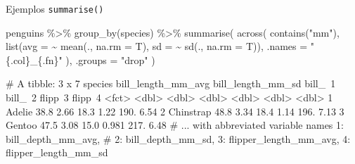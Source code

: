 \documentclass[
  ignorenonframetext,
  aspectratio=169]{beamer}
\newenvironment{Shaded}{\begin{snugshade}}{\end{snugshade}}
\newcommand{\AttributeTok}[1]{\textcolor[rgb]{0.77,0.63,0.00}{#1}}
\newcommand{\FunctionTok}[1]{\textcolor[rgb]{0.00,0.00,0.00}{#1}}
\newcommand{\NormalTok}[1]{#1}
\newcommand{\SpecialCharTok}[1]{\textcolor[rgb]{0.00,0.00,0.00}{#1}}
\newcommand{\StringTok}[1]{\textcolor[rgb]{0.31,0.60,0.02}{#1}}
\let\oldverbatim\verbatim
\let\endoldverbatim\endverbatim
\renewenvironment{verbatim}{\tiny\oldverbatim}{\endoldverbatim}
\begin{document}
\begin{frame}[fragile]{Ejemplos \texttt{summarise()}}
\protect\hypertarget{ejemplos-summarise-3}{}
\begin{Shaded}
\begin{Highlighting}[]
\NormalTok{penguins }\SpecialCharTok{\%\textgreater{}\%}
  \FunctionTok{group\_by}\NormalTok{(species) }\SpecialCharTok{\%\textgreater{}\%}
  \FunctionTok{summarise}\NormalTok{(}
    \FunctionTok{across}\NormalTok{(}
      \FunctionTok{contains}\NormalTok{(}\StringTok{"mm"}\NormalTok{),}
      \FunctionTok{list}\NormalTok{(}\AttributeTok{avg =} \SpecialCharTok{\textasciitilde{}} \FunctionTok{mean}\NormalTok{(., }\AttributeTok{na.rm =}\NormalTok{ T), }\AttributeTok{sd =} \SpecialCharTok{\textasciitilde{}} \FunctionTok{sd}\NormalTok{(., }\AttributeTok{na.rm =}\NormalTok{ T)),}
      \AttributeTok{.names =} \StringTok{"\{.col\}\_\{.fn\}"}
\NormalTok{    ),}
    \AttributeTok{.groups =} \StringTok{"drop"}
\NormalTok{  )}
\end{Highlighting}
\end{Shaded}

\begin{verbatim}
# A tibble: 3 x 7
  species   bill_length_mm_avg bill_length_mm_sd bill_~1 bill_~2 flipp~3 flipp~4
  <fct>                  <dbl>             <dbl>   <dbl>   <dbl>   <dbl>   <dbl>
1 Adelie                  38.8              2.66    18.3   1.22     190.    6.54
2 Chinstrap               48.8              3.34    18.4   1.14     196.    7.13
3 Gentoo                  47.5              3.08    15.0   0.981    217.    6.48
# ... with abbreviated variable names 1: bill_depth_mm_avg,
#   2: bill_depth_mm_sd, 3: flipper_length_mm_avg, 4: flipper_length_mm_sd
\end{verbatim}
\end{frame}
\end{document}
